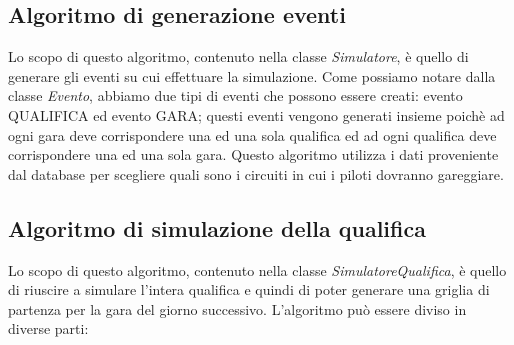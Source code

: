 \subsection{Algoritmo di generazione eventi}
Lo scopo di questo algoritmo, contenuto nella classe \textit{Simulatore}, è quello di generare gli eventi su cui effettuare la simulazione. Come possiamo notare dalla classe \textit{Evento}, abbiamo due tipi di eventi che possono essere creati: evento QUALIFICA ed evento GARA; questi eventi vengono generati insieme poichè ad ogni gara deve corrispondere una ed una sola qualifica ed ad ogni qualifica deve corrispondere una ed una sola gara. Questo algoritmo utilizza i dati proveniente dal database per scegliere quali sono i circuiti in cui i piloti dovranno gareggiare.
\subsection{Algoritmo di simulazione della qualifica}
Lo scopo di questo algoritmo, contenuto nella classe \textit{SimulatoreQualifica}, è quello di riuscire a simulare l'intera qualifica e quindi di poter generare una griglia di partenza per la gara del giorno successivo. L'algoritmo può essere diviso in diverse parti:

